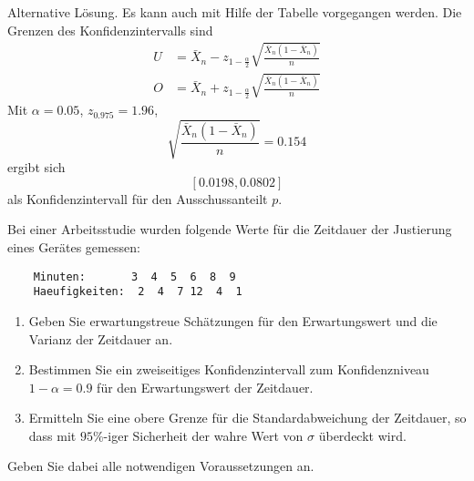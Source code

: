 \begin{enumerate}
        Alternative Lösung. Es kann auch mit Hilfe der Tabelle vorgegangen werden. 
        Die Grenzen des Konfidenzintervalls sind 
        \begin{align*}
            U &= \bar X_n - z_{1 - \frac{\alpha}{2}} \sqrt{ \frac{\bar X_n (1-\bar X_n)}{n}} \\
            O &= \bar X_n + z_{1 - \frac{\alpha}{2}} \sqrt{ \frac{\bar X_n (1-\bar X_n)}{n}}
        \end{align*}
        Mit $\alpha=0.05$, $z_{0.975}=1.96$, 
        \begin{equation*}
            \sqrt{ \frac{\bar X_{n}(1-\bar X_n)}{n}} = 0.154
        \end{equation*}
        ergibt sich
        \begin{equation*}
            \left[ 0.0198, 0.0802 \right]
        \end{equation*}
        als Konfidenzintervall für den Ausschussanteilt $p$.
\end{enumerate}


 Bei einer Arbeitsstudie wurden folgende
Werte für die Zeitdauer der Justierung eines Gerätes gemessen:
\begin{lstlisting}
    Minuten:       3  4  5  6  8  9
    Haeufigkeiten:  2  4  7 12  4  1
\end{lstlisting}
\begin{enumerate}
    \item Geben Sie erwartungstreue Schätzungen für den Erwartungswert und die
        Varianz der Zeitdauer an.

    \item Bestimmen Sie ein zweiseitiges Konfidenzintervall zum Konfidenzniveau
        $1-\alpha=0.9$ für den Erwartungswert der Zeitdauer. 
    \item Ermitteln Sie eine obere Grenze für die Standardabweichung der Zeitdauer,
        so dass mit $95\%$-iger Sicherheit der wahre Wert von $\sigma$ überdeckt
        wird.
\end{enumerate}
Geben Sie dabei alle notwendigen Voraussetzungen an.

